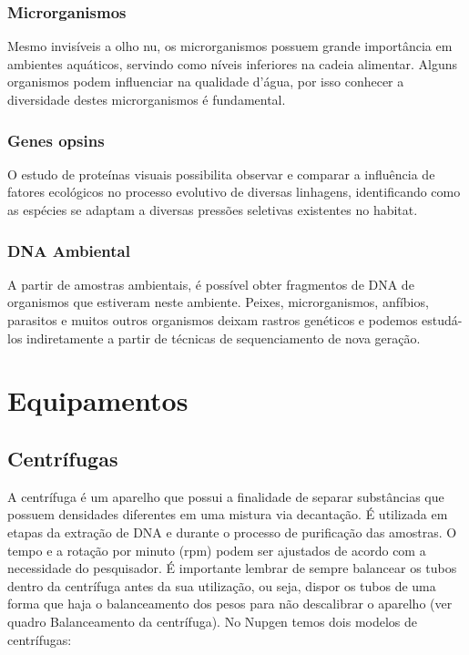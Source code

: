 \documentclass[
  letterpaper,
  DIV=11,
  numbers=noendperiod]{scrreprt}
\begin{document}
\hypertarget{microrganismos}{%
\subsection{Microrganismos}\label{microrganismos}}

Mesmo invisíveis a olho nu, os microrganismos possuem grande importância
em ambientes aquáticos, servindo como níveis inferiores na cadeia
alimentar. Alguns organismos podem influenciar na qualidade d'água, por
isso conhecer a diversidade destes microrganismos é fundamental.

\hypertarget{genes-opsins}{%
\subsection{Genes opsins}\label{genes-opsins}}

O estudo de proteínas visuais possibilita observar e comparar a
influência de fatores ecológicos no processo evolutivo de diversas
linhagens, identificando como as espécies se adaptam a diversas pressões
seletivas existentes no habitat.

\hypertarget{dna-ambiental}{%
\subsection{DNA Ambiental}\label{dna-ambiental}}

A partir de amostras ambientais, é possível obter fragmentos de DNA de
organismos que estiveram neste ambiente. Peixes, microrganismos,
anfíbios, parasitos e muitos outros organismos deixam rastros genéticos
e podemos estudá-los indiretamente a partir de técnicas de
sequenciamento de nova geração.


\hypertarget{equipamentos}{%
\chapter{Equipamentos}\label{equipamentos}}

\hypertarget{centruxedfugas}{%
\section{Centrífugas}\label{centruxedfugas}}

A centrífuga é um aparelho que possui a finalidade de separar
substâncias que possuem densidades diferentes em uma mistura via
decantação. É utilizada em etapas da extração de DNA e durante o
processo de purificação das amostras. O tempo e a rotação por minuto
(rpm) podem ser ajustados de acordo com a necessidade do pesquisador. É
importante lembrar de sempre balancear os tubos dentro da centrífuga
antes da sua utilização, ou seja, dispor os tubos de uma forma que haja
o balanceamento dos pesos para não descalibrar o aparelho (ver quadro
Balanceamento da centrífuga). No Nupgen temos dois modelos de
centrífugas:
\end{document}
